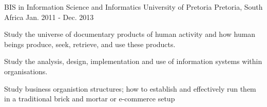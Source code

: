 

\begin{cventries}

  \cventry
    {BIS in Information Science and Informatics} %
    {University of Pretoria} %
    {Pretoria, South Africa} %
    {Jan. 2011 - Dec. 2013} %
    {
      \begin{cvitems} %
        \item {Study the universe of documentary products of human activity and how human beings produce, seek, retrieve, and use these products.}
        \item {Study the analysis, design, implementation and use of information systems within organisations.}
        \item {Study business organistion structures; how to establish and effectively run them in a traditional brick and mortar or e-commerce setup}
      \end{cvitems}
    }
\end{cventries}
